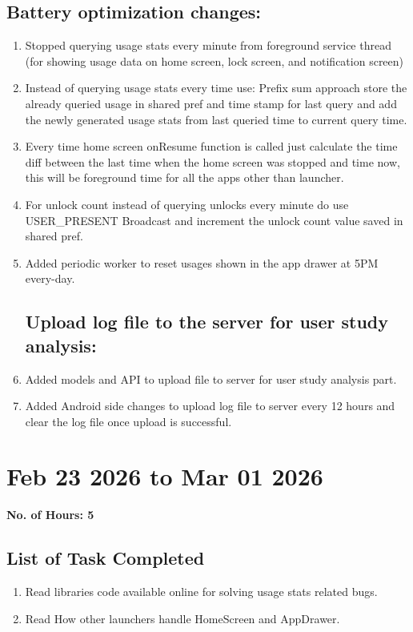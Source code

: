 \documentclass[12pt]{article}
\begin{document}
\begin{enumerate}
    \subsection{Battery optimization changes: }
    \begin{enumerate}
    \item Stopped querying usage stats every minute from foreground service thread (for showing usage data on home screen, lock screen, and notification screen)
    \item Instead of querying usage stats every time use: Prefix sum approach store the already queried usage in shared pref and time stamp for last query and add the newly generated usage stats from last queried time to current query time.
    \item Every time home screen onResume function is called just calculate the time diff between the last time when the home screen was stopped and time now, this will be foreground time for all the apps other than launcher.
    \item For unlock count instead of querying unlocks every minute do use USER\_PRESENT Broadcast and increment the unlock count value saved in shared pref.
    \item Added periodic worker to reset usages shown in the app drawer at 5PM every-day.
    \subsection{Upload log file to the server for user study analysis: }
    \item Added models and API to upload file to server for user study analysis part.
    \item Added Android side changes to upload log file to server every 12 hours and clear the log file once upload is successful.
    \end{enumerate}
    \section{Feb 23 2026 to Mar 01 2026}
    {\bf No. of Hours: 5}
    \subsection{List of Task Completed}
    \begin{enumerate}
        \item Read libraries code available online for solving usage stats related bugs.
        \item Read How other launchers handle HomeScreen and AppDrawer.
    \end{enumerate}

\end{enumerate}
\end{document}
